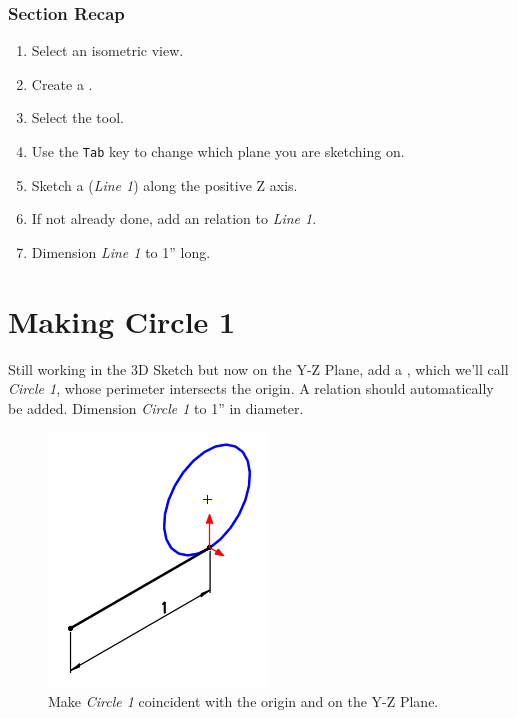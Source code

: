 \subsubsection{Section Recap}

\begin{enumerate}
\item{} Select an isometric view.
\item{} Create a .
\item{} Select the  tool.
\item{} Use the \texttt{Tab} key to change which plane you are sketching on.
\item{} Sketch a  (\emph{Line 1}) along the positive Z axis.
\item{} If not already done, add an  relation to \emph{Line 1}.
\item{} Dimension \emph{Line 1} to 1'' long.
\end{enumerate}

\section{Making Circle 1}

\label{sec:making-circle-1}
Still working in the 3D Sketch but now on the Y-Z Plane, add a , which we'll
call \emph{Circle 1}, whose
perimeter intersects the origin. A  relation should
automatically be
added. Dimension \emph{Circle 1} to 1'' in diameter.

\begin{figure}[H]
\begin{center}
\includegraphics{images/figures/Making-Circle-1.png}
\end{center}
\caption{Make \emph{Circle 1} coincident with the origin and on the Y-Z Plane.
\label{making-circle-1}}

\end{figure}

